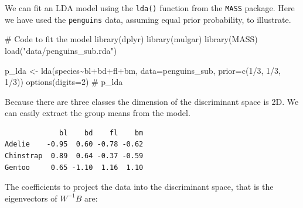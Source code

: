 \documentclass[
  letterpaper,
]{krantz}
\newenvironment{Shaded}{\begin{snugshade}}{\end{snugshade}}
\newcommand{\AttributeTok}[1]{\textcolor[rgb]{0.40,0.45,0.13}{#1}}
\newcommand{\CommentTok}[1]{\textcolor[rgb]{0.37,0.37,0.37}{#1}}
\newcommand{\DecValTok}[1]{\textcolor[rgb]{0.68,0.00,0.00}{#1}}
\newcommand{\FunctionTok}[1]{\textcolor[rgb]{0.28,0.35,0.67}{#1}}
\newcommand{\NormalTok}[1]{\textcolor[rgb]{0.00,0.23,0.31}{#1}}
\newcommand{\OtherTok}[1]{\textcolor[rgb]{0.00,0.23,0.31}{#1}}
\newcommand{\SpecialCharTok}[1]{\textcolor[rgb]{0.37,0.37,0.37}{#1}}
\newcommand{\StringTok}[1]{\textcolor[rgb]{0.13,0.47,0.30}{#1}}
\begin{document}
We can fit an LDA model using the \texttt{lda()} function from the
\texttt{MASS} package. Here we have used the \texttt{penguins} data,
assuming equal prior probability, to illustrate.

\begin{Shaded}
\begin{Highlighting}[]
\CommentTok{\# Code to fit the model}
\FunctionTok{library}\NormalTok{(dplyr)}
\FunctionTok{library}\NormalTok{(mulgar)}
\FunctionTok{library}\NormalTok{(MASS)}
\FunctionTok{load}\NormalTok{(}\StringTok{"data/penguins\_sub.rda"}\NormalTok{)}

\NormalTok{p\_lda }\OtherTok{\textless{}{-}} \FunctionTok{lda}\NormalTok{(species}\SpecialCharTok{\textasciitilde{}}\NormalTok{bl}\SpecialCharTok{+}\NormalTok{bd}\SpecialCharTok{+}\NormalTok{fl}\SpecialCharTok{+}\NormalTok{bm, }
             \AttributeTok{data=}\NormalTok{penguins\_sub,}
             \AttributeTok{prior=}\FunctionTok{c}\NormalTok{(}\DecValTok{1}\SpecialCharTok{/}\DecValTok{3}\NormalTok{, }\DecValTok{1}\SpecialCharTok{/}\DecValTok{3}\NormalTok{, }\DecValTok{1}\SpecialCharTok{/}\DecValTok{3}\NormalTok{))}
\FunctionTok{options}\NormalTok{(}\AttributeTok{digits=}\DecValTok{2}\NormalTok{)}
\CommentTok{\# p\_lda}
\end{Highlighting}
\end{Shaded}

Because there are three classes the dimension of the discriminant space
is 2D. We can easily extract the group means from the model.

\begin{Shaded}
\end{Shaded}

\begin{verbatim}
             bl    bd    fl    bm
Adelie    -0.95  0.60 -0.78 -0.62
Chinstrap  0.89  0.64 -0.37 -0.59
Gentoo     0.65 -1.10  1.16  1.10
\end{verbatim}

The coefficients to project the data into the discriminant space, that
is the eigenvectors of \(W^{-1}B\) are:

\begin{Shaded}
\end{Shaded}
\end{document}
